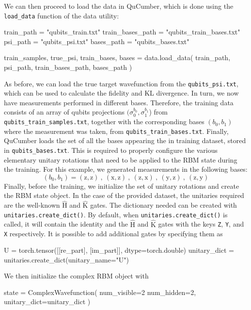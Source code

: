 \documentclass[submission, Phys, hidelnks]{SciPost}
\begin{document}
We can then proceed to load the data in QuCumber, which is done using the \verb|load_data| function of the data utility:
\begin{python}
train_path = "qubits_train.txt"
train_bases_path = "qubits_train_bases.txt"
psi_path = "qubits_psi.txt"
bases_path = "qubits_bases.txt"

train_samples, true_psi, train_bases, bases = data.load_data(
  train_path, psi_path, train_bases_path, bases_path
)
\end{python}
As before, we can load the true target wavefunction from the \verb|qubits_psi.txt|, which can be used to calculate the fidelity and KL divergence. In turn, we now have measurements performed in different bases. Therefore, the training data consists of an array of qubits projections $(\sigma_0^{b_0},\sigma_1^{b_1}$) from \verb|qubits_train_samples.txt|, together with the corresponding bases $(b_0,b_1)$ where the measurement was taken, from \verb|qubits_train_bases.txt|. Finally, QuCumber loads the set of all the bases appearing the in training dataset, stored in \verb|qubits_bases.txt|. This is required to properly configure the various elementary unitary rotations that need to be applied to the RBM state during the training. For this example, we generated measurements in the following bases:
\begin{equation}
    (b_0, b_1)=(\mathrm{z},\mathrm{z})\:,\:(\mathrm{x},\mathrm{z})\:,\:(\mathrm{z},\mathrm{x})\:,\:(\mathrm{y},\mathrm{z})\:,\:(\mathrm{z},\mathrm{y})
\end{equation}
Finally, before the training, we initialize the set of unitary rotations and create the RBM state object. In the case of the provided dataset, the unitaries required are the well-known $\hat{\mathrm{H}}$ and $\hat{\mathrm{K}}$ gates. The dictionary needed can be created with \verb|unitaries.create_dict()|. 
By default, when \verb|unitaries.create_dict()| is called, it will contain the identity and the $\hat{\mathrm{H}}$ and $\hat{\mathrm{K}}$ gates with the keys \verb|Z|, \verb|Y|, and \verb|X| respectively. It is possible to add additional gates by specifying them as 
\begin{python}
U = torch.tensor([[re_part], [im_part]], dtype=torch.double)
unitary_dict = unitaries.create_dict(unitary_name="U")
\end{python}

We then initialize the complex RBM object with
\begin{python}
state = ComplexWavefunction(
   num_visible=2 num_hidden=2, unitary_dict=unitary_dict
)
\end{python}
\end{document}
